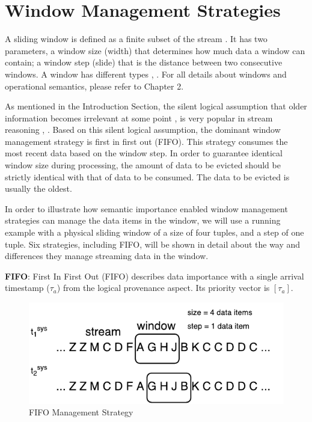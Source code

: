 \section{Window Management Strategies}
A sliding window is defined as a finite subset of the stream \cite{botan2010secret}. 
It has two parameters, a window size (width) that determines how much data a window can contain; 
a window step (slide) that is the distance between two consecutive windows. 
A window has different types \cite{barbieri2010querying}, \cite{patroumpas2006window}.
For all details about windows and operational semantics, please refer to Chapter 2. 

As mentioned in the Introduction Section, the silent logical assumption that older information becomes irrelevant at some point \cite{barbieri2010stream}, \cite{stuckenschmidt2010towards} is very popular in stream reasoning \cite{golab2003processing}, \cite{barbieri2010deductive}.
Based on this silent logical assumption, the dominant window management strategy is first in first out (FIFO). 
This strategy consumes the most recent data based on the window step. 
In order to guarantee identical window size during processing, the amount of data to be evicted should be strictly identical with that of data to be consumed.
The data to be evicted is usually the oldest.

In order to illustrate how semantic importance enabled window management strategies can manage the data items in the window, we will use a running example with a physical sliding window of a size of four tuples, and a step of one tuple. 
Six strategies, including FIFO, will be shown in detail about the way and differences they manage streaming data in the window.

\textbf{FIFO}:
First In First Out (FIFO) describes data importance with a single arrival timestamp ($\tau_{a}$) from the logical provenance aspect. 
Its priority vector is $[\tau_{a}]$.

\begin{figure}[!htbp]
	\centering
    \includegraphics[width=5in]{img/3-sififo.pdf}
    \caption{FIFO Management Strategy}
    \label{fig:3-sififo}
\end{figure}

